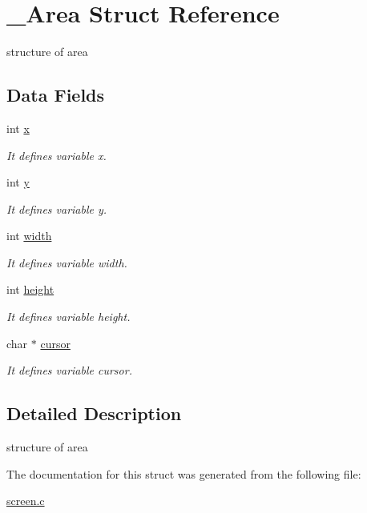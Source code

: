 \hypertarget{struct__Area}{}\section{\+\_\+\+Area Struct Reference}
\label{struct__Area}


structure of area  


\subsection*{Data Fields}
\begin{DoxyCompactItemize}
\item 
\mbox{\label{struct__Area_a093b8c2929094bac88bbf5ee7db85573}} 
int \hyperlink{struct__Area_a093b8c2929094bac88bbf5ee7db85573}{x}
\begin{DoxyCompactList}\small\item\em It defines variable x. \end{DoxyCompactList}\item 
\mbox{\label{struct__Area_a867e601f05480db03237c3a17d4c77f8}} 
int \hyperlink{struct__Area_a867e601f05480db03237c3a17d4c77f8}{y}
\begin{DoxyCompactList}\small\item\em It defines variable y. \end{DoxyCompactList}\item 
\mbox{\label{struct__Area_aa2f753fc3d254821603ac4512db814f1}} 
int \hyperlink{struct__Area_aa2f753fc3d254821603ac4512db814f1}{width}
\begin{DoxyCompactList}\small\item\em It defines variable width. \end{DoxyCompactList}\item 
\mbox{\label{struct__Area_a22627de8e529d631c17157f1f68cb5ac}} 
int \hyperlink{struct__Area_a22627de8e529d631c17157f1f68cb5ac}{height}
\begin{DoxyCompactList}\small\item\em It defines variable height. \end{DoxyCompactList}\item 
\mbox{\label{struct__Area_aa042b0549789b75fd133b67ad7d0fd9d}} 
char $\ast$ \hyperlink{struct__Area_aa042b0549789b75fd133b67ad7d0fd9d}{cursor}
\begin{DoxyCompactList}\small\item\em It defines variable cursor. \end{DoxyCompactList}\end{DoxyCompactItemize}


\subsection{Detailed Description}
structure of area 

The documentation for this struct was generated from the following file\+:\begin{DoxyCompactItemize}
\item 
\hyperlink{screen_8c}{screen.\+c}\end{DoxyCompactItemize}
